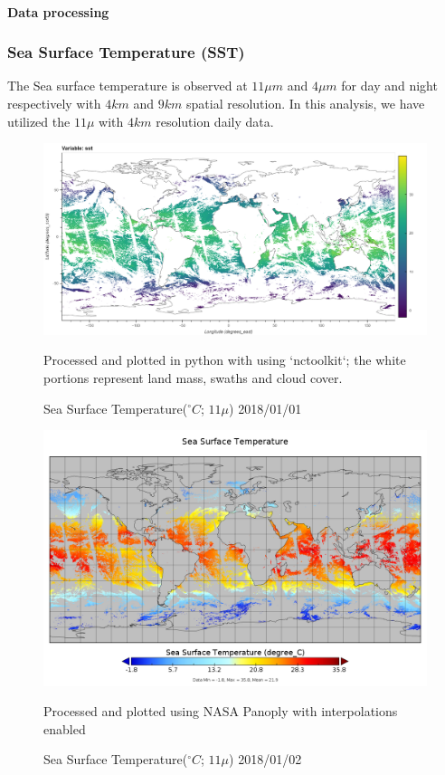 \paragraph{Data processing}
    \subsubsection{Sea Surface Temperature (SST)} The Sea surface temperature is observed at $11\mu m$ and $4\mu m$ for day and night respectively with $4km$ and $9km$ spatial resolution.
    In this analysis, we have utilized the $11\mu$ with $4km$ resolution daily data.

    \begin{figure}[H]
        \centering
        \includegraphics[width=\textwidth]{figs/sst_20180101.png}
        \caption{Sea Surface Temperature($^\circ C$; $11\mu$) 2018/01/01}
        {\footnotesize Processed and plotted in python with using `nctoolkit`;}
        {\footnotesize the white portions represent land mass, swaths and cloud cover.}
    \end{figure}

    \begin{figure}[H]
        \centering
        \includegraphics[width=14cm, trim={{0cm} {0.5cm} {0cm} {0cm}}, clip]{figs/sst_in_AQUA_MODIS_20180102.png}
        \caption{Sea Surface Temperature($^\circ C$; $11\mu$) 2018/01/02}
        {\footnotesize Processed and plotted using NASA Panoply with interpolations enabled}
    \end{figure}

